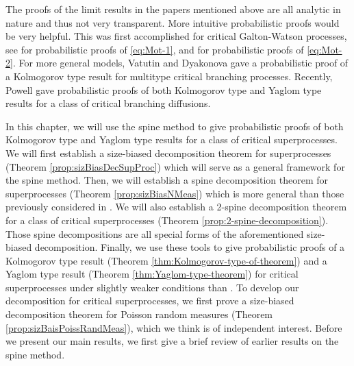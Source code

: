 \documentclass[UTF8]{pkuthss}
\theoremstyle{plain}
\theoremstyle{definition}
\numberwithin{equation}{section}
\begin{document}
	The proofs of the limit results in the papers mentioned above 
	are all analytic in nature and thus not very transparent.
	More intuitive probabilistic proofs would be very helpful.
	This was first accomplished for critical Galton-Watson processes, see \cite{Geiger1999Elementary, LyonsPemantlePeres1995Conceptual} for probabilistic proofs of \eqref{eq:Mot-1}, and \cite{Geiger2000A-new, LyonsPemantlePeres1995Conceptual, RenSongSun2018A-2-spine} for probabilistic proofs of \eqref{eq:Mot-2}.
	For more general models, Vatutin and Dyakonova \cite{VatutinDyakonova2001The-survival} gave a probabilistic proof of a Kolmogorov type result for multitype critical branching processes.
	Recently, Powell \cite{Powell2016An-invariance} gave probabilistic proofs of both Kolmogorov type and Yaglom type results for a class of critical branching diffusions. 
	

	In this chapter, we will use the spine method to give probabilistic proofs of both Kolmogorov type and Yaglom type results for a class of critical superprocesses. 
	We will first establish a size-biased decomposition theorem for superprocesses (Theorem \ref{prop:sizBiasDecSupProc}) which will serve as a general framework for the spine method.
	Then, we will establish a spine decomposition theorem for superprocesses (Theorem \ref{prop:sizBiasNMeas}) which is more general than those previously considered in \cite{EckhoffKyprianouWinkel2015Spines, EnglanderKyprianou2004Local, LiuRenSong2009LlogL}.
	We will also establish a 2-spine decomposition theorem for a class of critical superprocesses (Theorem \ref{prop:2-spine-decomposition}).
	Those spine decompositions are all special forms of
		the aforementioned size-biased decomposition.
	Finally, we use these tools to give probabilistic proofs of a Kolmogorov type result (Theorem \ref{thm:Kolmogorov-type-of-theorem}) and a Yaglom type result (Theorem \ref{thm:Yaglom-type-theorem}) 
for critical superprocesses under slightly weaker conditions than \cite{RenSongZhang2015Limit}.
To develop our decomposition for critical superprocesses, we first prove a size-biased decomposition theorem for Poisson random measures (Theorem \ref{prop:sizBaisPoissRandMeas}),
which we think is of independent interest.
Before we present our main results, we first give a brief review of earlier results on the spine method.
	
\end{document}
